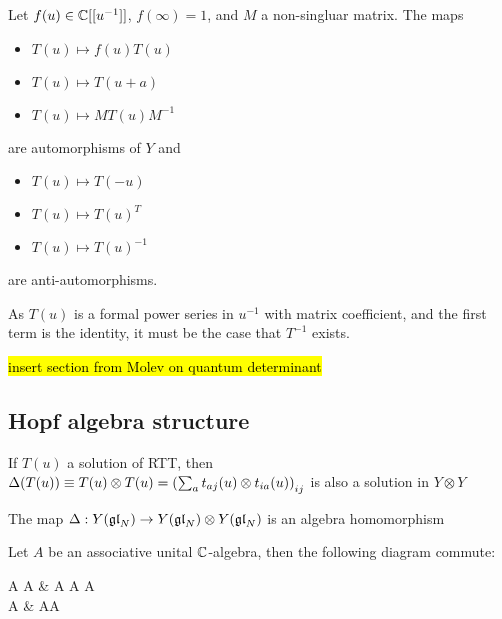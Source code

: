 \documentclass{article}
\begin{document}
\begin{prop}
Let $f(u) \in \mathbb{C}[[u^{-1}]]$, $f(\infty) = 1$, and $M$ a non-singluar matrix. The maps 
\begin{itemize}
    \item $T(u) \mapsto f(u) T(u)$
    \item $T(u) \mapsto T(u+a)$ 
    \item $T(u) \mapsto MT(u) M^{-1}$
\end{itemize}
are automorphisms of $Y$ and 
\begin{itemize}
    \item $T(u) \mapsto T(-u)$
    \item $T(u) \mapsto T(u)^T$
    \item $T(u) \mapsto T(u)^{-1}$
\end{itemize}
are anti-automorphisms. 
\end{prop}

\begin{remark}
As $T(u)$ is a formal power series in $u^{-1}$ with matrix coefficient, and the first term is the identity, it must be the case that $T^{-1}$ exists.
\end{remark}


\hl{insert section from Molev on quantum determinant}

\subsection{Hopf algebra structure}

\begin{prop}
If $T(u)$ a solution of RTT, then $\Delta (T(u)) \equiv T(u) \otimes T(u) = \left( \sum_a t_{aj}(u) \otimes t_{ia}(u) \right)_{ij}$ is also a solution in $Y \otimes Y$
\end{prop}
\begin{corollary}
The map $\Delta : Y(\mathfrak{gl}_N) \to Y(\mathfrak{gl}_N) \otimes Y(\mathfrak{gl}_N)$ is an algebra homomorphism
\end{corollary}

Let $A$ be an associative unital $\mathbb{C}$-algebra, then the following diagram commute:

\begin{tkz}
A \otimes A \arrow[d,"m"'] & A \otimes A \otimes A \arrow[l,"m \otimes \id"'] \arrow[d,"\id \otimes m"] \\ A & A\otimes A \arrow[l,"m"]
\end{tkz}
\end{document}
